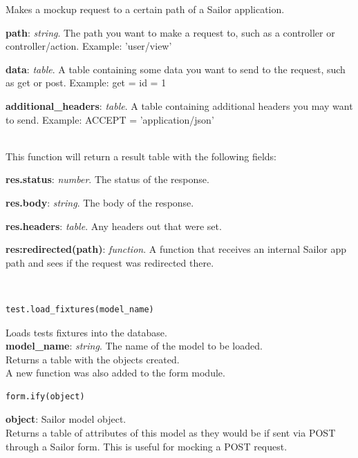 \documentclass{article}
\begin{document}
Makes a mockup request to a certain path of a Sailor application.

\begin{description}\item \textbf{path}: \textit{string}. The path you want to make a request to, such as a controller or controller/action. Example: 'user/view'
\item \textbf{data}: \textit{table}. A table containing some data you want to send to the request, such as get or post. Example: {get = {id = 1}}
\item \textbf{additional\_headers}: \textit{table}. A table containing additional headers you may want to send. Example: {ACCEPT = 'application/json'}
\end{description}\\

This function will return a result table with the following fields:\\
\begin{description}\item \textbf{res.status}: \textit{number}. The status of the response.
\item \textbf{res.body}: \textit{string}. The body of the response.
\item \textbf{res.headers}: \textit{table}. Any headers out that were set.
\item \textbf{res:redirected(path)}: \textit{function}. A function that receives an internal Sailor app path and sees if the request was redirected there.\\
\end{description}\\

\begin{lstlisting}[frame=single]
test.load_fixtures(model_name)
\end{lstlisting}
Loads tests fixtures into the database.\\
\textbf{model\_name}: \textit{string}. The name of the model to be loaded.\\
Returns a table with the objects created.\\

A new function was also added to the form module.
\begin{lstlisting}[frame=single]
form.ify(object)
\end{lstlisting}
\textbf{object}: Sailor model object.\\
Returns a table of attributes of this model as they would be if sent via POST through a Sailor form. This is useful for mocking a POST request.  \\
\end{document}
